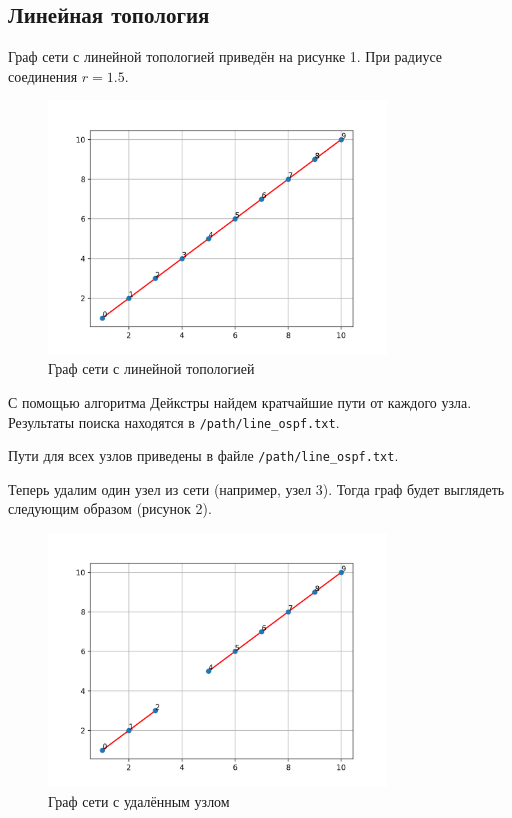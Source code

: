 \documentclass[a4paper,14pt]{extarticle}
\begin{document}
\subsection{Линейная топология}

Граф сети с линейной топологией приведён на рисунке 1. При радиусе соединения $r=1.5$.

\begin{figure}[htbp]
    \centering
    \includegraphics[width=0.8\textwidth]{img/line_graph.png}
    \caption{Граф сети с линейной топологией}
    \label{fig:hamiltonianGraph}
\end{figure}


С помощью алгоритма Дейкстры найдем кратчайшие пути от каждого узла. Результаты поиска находятся в \texttt{/path/line\_ospf.txt}.



Пути для всех узлов приведены в файле \texttt{/path/line\_ospf.txt}.

Теперь удалим один узел из сети (например, узел 3). Тогда граф будет выглядеть следующим образом (рисунок 2).

\begin{figure}[htbp]
    \centering
    \includegraphics[width=0.8\textwidth]{img/line_modified.png}
    \caption{Граф сети с удалённым узлом}
    \label{fig:hamiltonianGraph}
\end{figure}
\end{document}
